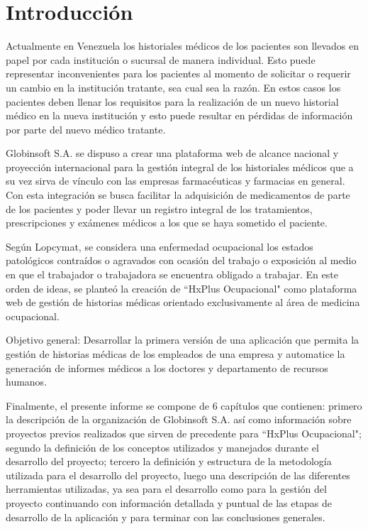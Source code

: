 \chapter*{Introducción}

Actualmente en Venezuela los historiales médicos de los pacientes son llevados en papel por cada institución o sucursal de manera individual. Esto puede representar inconvenientes para los pacientes al momento de solicitar o requerir un cambio en la institución tratante, sea cual sea la razón. En estos casos los pacientes deben llenar los requisitos para la realización de un nuevo historial médico en la nueva institución y esto puede resultar en pérdidas de información por parte del nuevo médico tratante.

Globinsoft S.A. se dispuso a crear una plataforma web de alcance nacional y proyección internacional para la gestión integral de los historiales médicos que a su vez sirva de vínculo con las empresas farmacéuticas y farmacias en general. Con esta integración se busca facilitar la adquisición de medicamentos de parte de los pacientes y poder llevar un registro integral de los tratamientos, prescripciones y exámenes médicos a los que se haya sometido el paciente.

Según Lopcymat, se considera una enfermedad ocupacional los estados patológicos contraídos o agravados con ocasión del trabajo o exposición al medio en que el trabajador o trabajadora se encuentra obligado a trabajar. En este orden de ideas, se planteó la creación de ``HxPlus Ocupacional" como plataforma web de gestión de historias médicas orientado exclusivamente al área de medicina ocupacional.

Objetivo general: Desarrollar la primera versión de una aplicación que permita la gestión de historias médicas de los empleados de una empresa y automatice la generación de informes médicos a los doctores y departamento de recursos humanos.


Finalmente, el presente informe se compone de 6 capítulos que contienen: primero la descripción de la organización de Globinsoft S.A. así como información sobre proyectos previos realizados que sirven de precedente para ``HxPlus Ocupacional"; segundo la definición de los conceptos utilizados y manejados durante el desarrollo del proyecto; tercero la definición y estructura de la metodología utilizada para el desarrollo del proyecto, luego una descripción de las diferentes herramientas utilizadas, ya sea para el desarrollo como para la gestión del proyecto continuando con información detallada y puntual de las etapas de desarrollo de la aplicación y para terminar con las conclusiones generales.


\pagebreak